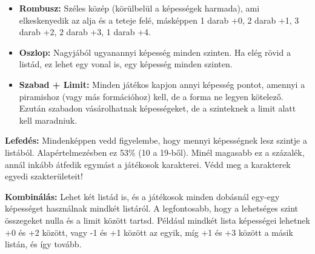 \begin{itemize}
    \item \textbf{Rombusz:} Széles közép (körülbelül a képességek harmada), ami elkeskenyedik az alja és a teteje felé, másképpen 1 darab +0, 2 darab +1, 3 darab +2, 2 darab +3, 1 darab +4.
    \item \textbf{Oszlop:} Nagyjából ugyanannyi képesség minden szinten. Ha elég rövid a listád, ez lehet egy vonal is, egy képesség minden szinten.
    \item \textbf{Szabad + Limit:} Minden játékos kapjon annyi képesség pontot, amennyi a piramishoz (vagy más formációhoz) kell, de a forma ne legyen kötelező. Ezután szabadon vásárolhatnak képességeket, de a szinteknek a limit alatt kell maradniuk.
\end{itemize}

\textbf{Lefedés:} Mindenképpen vedd figyelembe, hogy mennyi képességnek lesz szintje a listából. Alapértelmezésben ez 53\% (10 a 19‑ből). Minél magasabb ez a százalék, annál inkább átfedik egymást a játékosok karakterei. Védd meg a karakterek egyedi szakterületeit!

\textbf{Kombinálás:} Lehet két listád is, és a játékosok minden dobásnál egy‑egy képességet használnak mindkét listáról. A legfontosabb, hogy a lehetséges szint összegeket nulla és a limit között tartsd. Például mindkét lista képességei lehetnek +0 és +2 között, vagy -1 és +1 között az egyik, míg +1 és +3 között a másik listán, és így tovább.
